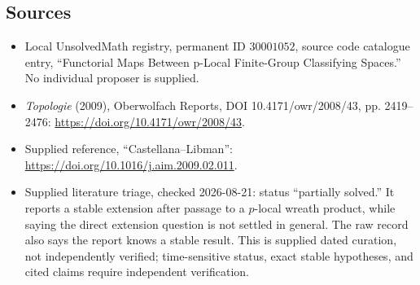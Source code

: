 \documentclass[11pt]{article}
\begin{document}
\subsection{Sources}
\begin{itemize}
\item Local UnsolvedMath registry, permanent ID \(30001052\), source code catalogue entry, ``Functorial Maps Between p-Local Finite-Group Classifying Spaces.'' No individual proposer is supplied.
\item \emph{Topologie} (2009), Oberwolfach Reports, DOI 10.4171/owr/2008/43, pp. 2419--2476: \url{https://doi.org/10.4171/owr/2008/43}.
\item Supplied reference, ``Castellana--Libman'': \url{https://doi.org/10.1016/j.aim.2009.02.011}.
\item Supplied literature triage, checked 2026-08-21: status ``partially solved.'' It reports a stable extension after passage to a \(p\)-local wreath product, while saying the direct extension question is not settled in general. The raw record also says the report knows a stable result. This is supplied dated curation, not independently verified; time-sensitive status, exact stable hypotheses, and cited claims require independent verification.
\end{itemize}
\end{document}
